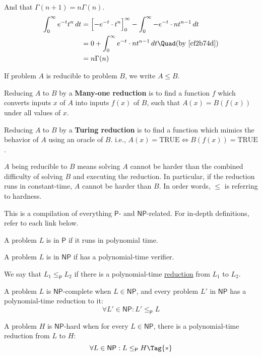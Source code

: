 And that $\Gamma(n+1)=n\Gamma(n)$.
\begin{align*}
  \int_0^\infty e^{-t}t^n\,dt
   &= \Bigl[-e^{-t}\cdot t^n\Bigr]_0^\infty-\int_0^\infty-e^{-t}\cdot nt^{n-1}\,dt \\
   &= 0+\int_0^\infty e^{-t}\cdot nt^{n-1}\,dt \Quad\text{(by \autoref{cf2b74d})}  \\
   &= n\Gamma(n)
\end{align*}

\label{e009acb}

If problem $A$ is reducible to problem $B$, we write $A\leq B$.

Reducing $A$ to $B$ by a \textbf{Many-one reduction} is to find a function $f$
which converts inputs $x$ of $A$ into inputs $f(x)$ of $B$, such that
$A(x)=B(f(x))$ under all values of $x$.

Reducing $A$ to $B$ by a \textbf{Turing reduction} is to find a function which
mimics the behavior of $A$ using an oracle of $B$. i.e., $A(x)=\text{TRUE}\iff
B(f(x))=\text{TRUE}$.

$A$ being reducible to $B$ means solving $A$ cannot be harder than the
combined difficulty of solving $B$ and executing the reduction. In
particular, if the reduction runs in constant-time, $A$ cannot be
harder than $B$. In order words, $\leq$ is referring to hardness.

\label{e04bcbc}

This is a compilation of everything $\mathsf P$- and $\mathsf{NP}$-related. For
in-depth definitions, refer to each link below.

A problem $L$ is in $\mathsf P$ if it runs in polynomial time.

A problem $L$ is in $\mathsf{NP}$ if has a polynomial-time verifier.

We say that $L_1\leq_{\mathsf P}L_2$ if there is a polynomial-time
\href{e009acb}{reduction} from $L_1$ to $L_2$.

A problem $L$ is $\mathsf{NP}$-complete when $L\in\mathsf{NP}$, and every
problem $L'$ in $\mathsf{NP}$ has a polynomial-time reduction to it:
$$
  \forall L'\in\mathsf{NP}: L'\leq_{\mathsf P}L
$$

A problem $H$ is $\mathsf{NP}$-hard when for every $L\in\mathsf{NP}$, there is
a polynomial-time reduction from $L$ to $H$:
\begin{equation*}
  \forall L\in\mathsf{NP}: L\leq_{\mathsf P}H\Tag{*}
\end{equation*}

